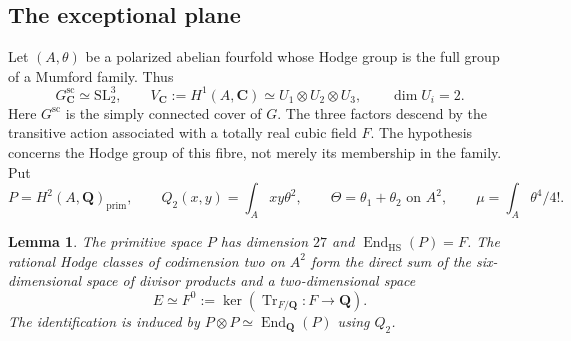 \documentclass[11pt]{article}
\newtheorem{lemma}[theorem]{Lemma}
\theoremstyle{definition}
\theoremstyle{remark}
\newcommand{\Q}{\mathbf Q}
\newcommand{\C}{\mathbf C}
\begin{document}
\subsection{The exceptional plane}

Let $(A,\theta)$ be a polarized abelian fourfold whose Hodge group is the
full group of a Mumford family. Thus
\[
 G^{\mathrm{sc}}_{\C}\simeq\mathrm{SL}_2^3,\qquad
 V_{\C}:=H^1(A,\C)\simeq U_1\otimes U_2\otimes U_3,
 \qquad \dim U_i=2.
\]
Here $G^{\mathrm{sc}}$ is the simply connected cover of $G$.
The three factors descend by the transitive action associated with a
totally real cubic field $F$. The hypothesis concerns the Hodge group
of this fibre, not merely its membership in the family. Put
\[
 P=H^2(A,\Q)_{\mathrm{prim}},\qquad
 Q_2(x,y)=\int_Axy\theta^2,\qquad
 \Theta=\theta_1+\theta_2\text{ on }A^2,\qquad
 \mu=\int_A\theta^4/4!.
\]

\begin{lemma}\label{lem:mumford-plane}
The primitive space $P$ has dimension $27$ and
$\operatorname{End}_{\mathrm{HS}}(P)=F$. The rational Hodge classes
of codimension two on $A^2$ form the direct sum of the six-dimensional
space of divisor products and a two-dimensional space
\[
 E\simeq F^0:=\ker(\operatorname{Tr}_{F/\Q}:F\longrightarrow\Q).
\]
The identification is induced by
$P\otimes P\simeq\operatorname{End}_{\Q}(P)$ using $Q_2$.
\end{lemma}
\end{document}
